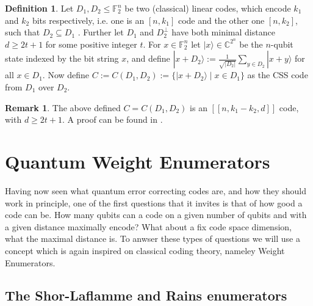\documentclass[12pt,a4paper,BCOR15mm,twoside,DIV12]{article}
\def\F{\mathbb{F}}
\def\C{\mathbb{C}}
\theoremstyle{definition}
\newtheorem{rem}[Satz]{Remark}
\newtheorem{defn}[Satz]{Definition}
\begin{document}
\begin{defn}

  Let $D_1, D_2 \leq \F_{2}^n $ be two (classical) linear codes, which encode $k_1$ and $k_2$ bits respectively, i.e. one is an  $[n,k_1]$ code and the other one $[n,k_2]$, such that $D_2 \subseteq D_1$ . Further let $D_1$ and $D_2^{\perp}$ have both minimal distance $d \geq 2t+1$ for some positive integer $t$.
  For $ x \in \F_{2}^n$ let $ |x \rangle \in \C^{2^n}$ be the $n$-qubit state indexed by the bit string $x$, and define $ | x + D_2 \rangle := \frac{1}{\sqrt{|D_2|}} \sum_{y \in D_2} | x + y \rangle$ for all $x \in D_1$.
  Now define $C := C (D_1,D_2) := \{ | x + D_2 \rangle \mid x \in D_1 \}$ as the CSS code from $D_1$ over $D_2$. 
\end{defn}

\begin{rem}
  The above defined $C = C(D_1,D_2)$ is an $[[n,k_1 - k_2,d]]$ code, with $d \geq 2t+1$. A proof can be found in \cite{NC}.
 \end{rem}

\clearpage \newpage
\section{Quantum Weight Enumerators}

Having now seen what quantum error correcting codes are, and how they should work in principle, one of the first questions that it invites is that of how good a code can be. 
How many qubits can a code on a given number of qubits and with a given distance maximally encode? What about a fix code space dimension, what the maximal distance is. 
To anwser these types of questions we will use a concept which is again inspired on classical coding theory, nameley Weight Enumerators. 

\subsection{The Shor-Laflamme and Rains enumerators}
\end{document}

